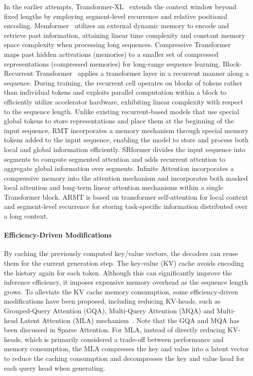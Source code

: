 \documentclass[11pt, a4paper, logo, copyright, nonumbering]{map}
\begin{document}
In the earlier attempts, Transformer-XL~\citep{TransformerXL} extends the context window beyond fixed lengths by employing segment-level recurrence and relative positional encoding. Memformer~\citep{Memformer} utilizes an external dynamic memory to encode and retrieve past information, attaining linear time complexity and constant memory space complexity when processing long sequences. Compressive Transformer~\citep{CompressiveTransformers} maps past hidden activations (memories) to a smaller set of compressed representations (compressed memories) for long-range sequence learning. Block-Recurrent Transformer~\cite{BlockRecurrentTransformers} applies a transformer layer in a recurrent manner along a sequence. During training, the recurrent cell operates on blocks of tokens rather than individual tokens and exploits parallel computation within a block to efficiently utilize accelerator hardware, exhibiting linear complexity with respect to the sequence length.
Unlike existing recurrent-based models that use special global tokens to store representations and place them at the beginning of the input sequence, RMT\cite{rmt} incorporates a memory mechanism through special memory tokens added to the input sequence, enabling the model to store and process both local and global information efficiently. SRformer\cite{segmentrecurrent} divides the input sequence into segments to compute segmented attention and adds recurrent attention to aggregate global information over segments. Infinite Attention\cite{infinitransformer} incorporates a compressive memory into the attention mechanism and incorporates both masked local attention and long-term linear attention mechanisms within a single Transformer block. ARMT\cite{armt} is based on transformer self-attention for local context and segment-level recurrence for storing task-specific information distributed over a long context.


\paragraph{Efficiency-Driven Modifications} 
By caching the previously computed key/value vectors, the decoders can reuse them for the current generation step. The key-value (KV) cache avoids encoding the history again for each token. Although this can significantly improve the inference efficiency, it imposes expensive memory overhead as the sequence length grows.
To alleviate the KV cache memory consumption, some efficiency-driven modifications have been proposed, including reducing KV-heads, such as Grouped-Query Attention (GQA), Multi-Query Attention (MQA) and  Multi-head Latent Attention (MLA) mechanism~\citep{liu2024deepseek}.
Note that the GQA and MQA has been discussed in Sparse Attention.
For MLA,
instead of directly reducing KV-heads, which is primarily considered a trade-off between performance and memory consumption, the MLA compresses the key and value into a latent vector to reduce the caching consumption and decompresses the key and value head for each query head when generating.
\end{document}

